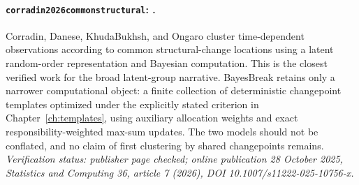 
\paragraph{\texttt{corradin2026commonstructural}: \citet{corradin2026commonstructural}.}
Corradin, Danese, KhudaBukhsh, and Ongaro cluster time-dependent observations according to common structural-change locations using a latent random-order representation and Bayesian computation. This is the closest verified work for the broad latent-group narrative. BayesBreak retains only a narrower computational object: a finite collection of deterministic changepoint templates optimized under the explicitly stated criterion in Chapter~\ref{ch:templates}, using auxiliary allocation weights and exact responsibility-weighted max-sum updates. The two models should not be conflated, and no claim of first clustering by shared changepoints remains. \textit{Verification status: publisher page checked; online publication 28 October 2025, Statistics and Computing 36, article 7 (2026), DOI 10.1007/s11222-025-10756-x.}
